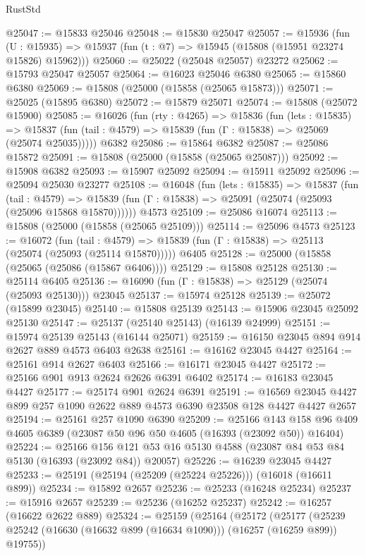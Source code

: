 \begin{lexlean}{RustStd}
\begin{coremodule}
@25047 := @15833 @25046
@25048 := @15830 @25047
@25057 := @15936
    (fun (U : @15935) => @15937 (fun (t : @7) => @15945 (@15808 (@15951 @23274 @15826) @15962)))
@25060 := @25022 (@25048 @25057) @23272
@25062 := @15793 @25047 @25057
@25064 := @16023 @25046 @6380
@25065 := @15860 @6380
@25069 := @15808 (@25000 (@15858 (@25065 @15873)))
@25071 := @25025 (@15895 @6380)
@25072 := @15879 @25071
@25074 := @15808 (@25072 @15900)
@25085 := @16026
    (fun (rty : @4265) =>
    @15836
      (fun (lets : @15835) =>
      @15837 (fun (tail : @4579) => @15839 (fun (Γ : @15838) => @25069 (@25074 @25035)))))
    @6382
@25086 := @15864 @6382
@25087 := @25086 @15872
@25091 := @15808 (@25000 (@15858 (@25065 @25087)))
@25092 := @15908 @6382
@25093 := @15907 @25092
@25094 := @15911 @25092
@25096 := @25094 @25030 @23277
@25108 := @16048
    (fun (lets : @15835) =>
    @15837
      (fun (tail : @4579) =>
      @15839 (fun (Γ : @15838) => @25091 (@25074 (@25093 (@25096 @15868 @15870))))))
    @4573
@25109 := @25086 @16074
@25113 := @15808 (@25000 (@15858 (@25065 @25109)))
@25114 := @25096 @4573
@25123 := @16072
    (fun (tail : @4579) => @15839 (fun (Γ : @15838) => @25113 (@25074 (@25093 (@25114 @15870)))))
    @6405
@25128 := @25000 (@15858 (@25065 (@25086 (@15867 @6406))))
@25129 := @15808 @25128
@25130 := @25114 @6405
@25136 := @16090 (fun (Γ : @15838) => @25129 (@25074 (@25093 @25130))) @23045
@25137 := @15974 @25128
@25139 := @25072 (@15899 @23045)
@25140 := @15808 @25139
@25143 := @15906 @23045 @25092 @25130
@25147 := @25137 (@25140 @25143) (@16139 @24999)
@25151 := @15974 @25139 @25143 (@16144 @25071)
@25159 := @16150 @23045 @894 @914 @2627 @889 @4573 @6403 @2638
@25161 := @16162 @23045 @4427
@25164 := @25161 @914 @2627 @6403
@25166 := @16171 @23045 @4427
@25172 := @25166 @901 @913 @2624 @2626 @6391 @6402
@25174 := @16183 @23045 @4427
@25177 := @25174 @901 @2624 @6391
@25191 := @16569 @23045 @4427 @899 @257 @1090 @2622 @889 @4573 @6390 @23508 @128 @4427 @4427 @2657
@25194 := @25161 @257 @1090 @6390
@25209 := @25166
    @143
    @158
    @96
    @409
    @4605
    @6389
    (@23087 @50 @96 @50 @4605 (@16393 (@23092 @50)) @16404)
@25224 := @25166
    @156
    @121
    @53
    @16
    @5130
    @4588
    (@23087 @84 @53 @84 @5130 (@16393 (@23092 @84)) @20057)
@25226 := @16239 @23045 @4427
@25233 := @25191 (@25194 (@25209 (@25224 @25226))) (@16018 (@16611 @899))
@25234 := @15892 @2657
@25236 := @25233 (@16248 @25234)
@25237 := @15916 @2657
@25239 := @25236 (@16252 @25237)
@25242 := @16257 (@16622 @2622 @889)
@25324 := @25159
    (@25164
      (@25172
        (@25177 (@25239 @25242 (@16630 (@16632 @899 (@16634 @1090))) (@16257 (@16259 @899)) @19755))

\end{coremodule}
\end{lexlean}
